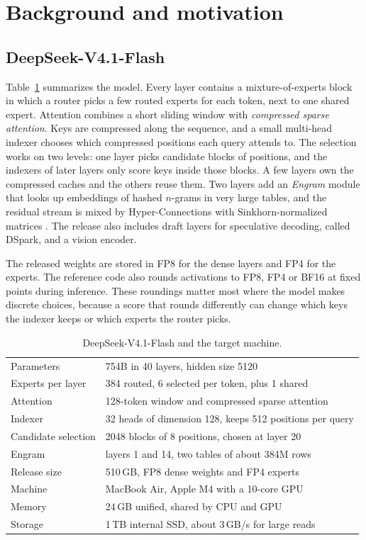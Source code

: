 \section{Background and motivation}
\label{sec:background}
\subsection{DeepSeek-V4.1-Flash}
Table~\ref{tab:model} summarizes the model. Every layer contains a mixture-of-experts block in which a router picks a few routed experts for each token, next to one shared expert. Attention combines a short sliding window with \emph{compressed sparse attention}. Keys are compressed along the sequence, and a small multi-head indexer \citep{deepseek32} chooses which compressed positions each query attends to. The selection works on two levels: one layer picks candidate blocks of positions, and the indexers of later layers only score keys inside those blocks. A few layers own the compressed caches and the others reuse them. Two layers add an \emph{Engram} module that looks up embeddings of hashed $n$-grams in very large tables, and the residual stream is mixed by Hyper-Connections with Sinkhorn-normalized matrices \citep{hyperconnections}. The release also includes draft layers for speculative decoding, called DSpark, and a vision encoder.

The released weights are stored in FP8 for the dense layers and FP4 for the experts. The reference code also rounds activations to FP8, FP4 or BF16 at fixed points during inference. These roundings matter most where the model makes discrete choices, because a score that rounds differently can change which keys the indexer keeps or which experts the router picks.

\begin{table}[t]
\centering
\small
\caption{DeepSeek-V4.1-Flash and the target machine.}
\label{tab:model}
\begin{tabular}{@{}ll@{}}
\toprule
Parameters & 754B in 40 layers, hidden size 5120 \\
Experts per layer & 384 routed, 6 selected per token, plus 1 shared \\
Attention & 128-token window and compressed sparse attention \\
Indexer & 32 heads of dimension 128, keeps 512 positions per query \\
Candidate selection & 2048 blocks of 8 positions, chosen at layer 20 \\
Engram & layers 1 and 14, two tables of about 384M rows \\
Release size & 510\,GB, FP8 dense weights and FP4 experts \\
\midrule
Machine & MacBook Air, Apple M4 with a 10-core GPU \\
Memory & 24\,GB unified, shared by CPU and GPU \\
Storage & 1\,TB internal SSD, about 3\,GB/s for large reads \\
\bottomrule
\end{tabular}
\end{table}


